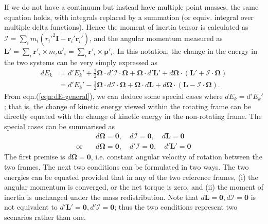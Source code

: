 If we do not have a continuum but instead have multiple point masses, the same equation holds, with integrals replaced by a summation (or equiv. integral over multiple delta functions). Hence the moment of inertia tensor is calculated as $\mathcal{I} = \sum_i m_i (r_i'^2 \mathbf{I} - \mathbf{r}_i'\mathbf{r}_i')$, and the angular momentum measured as $\mathbf{L}' = \sum_i \mathbf{r}'_i \times m_i \mathbf{u}'_i = \sum_i \mathbf{r}'_i \times \mathbf{p}'_i$.
In this notation, the change in the energy in the two systems can be very simply expressed as
%
\begin{equation}\label{eqn:dE-general}
\begin{aligned}
    dE_k &= d'E_k' + \frac{1}{2} \boldsymbol{\Omega} \cdot d' \mathcal{I} \cdot \boldsymbol{\Omega} + \boldsymbol{\Omega} \cdot d'\mathbf{L}' + d\boldsymbol{\Omega} \cdot (\mathbf{L}' + \mathcal{I}\cdot \boldsymbol{\Omega}) \\ 
    &= d'E_k' - \frac{1}{2} \boldsymbol{\Omega} \cdot d \mathcal{I} \cdot \boldsymbol{\Omega} + \boldsymbol{\Omega} \cdot d\mathbf{L} + d\boldsymbol{\Omega} \cdot (\mathbf{L} - \mathcal{I}\cdot \boldsymbol{\Omega}).
\end{aligned}
\end{equation}
%
From eqn.(\ref{eqn:dE-general}), we can deduce some special cases where $dE_k = d'E_k'$; that is, the change of kinetic energy viewed within the rotating frame can be directly equated with the change of kinetic energy in the non-rotating frame. The special cases can be summarised as 
%
\[
\begin{aligned}
    &d\boldsymbol{\Omega} = \mathbf{0},\quad d\mathcal{I} = \mathbf{0},\quad d\mathbf{L} = \mathbf{0} \\ 
    \text{or}\quad &d\boldsymbol{\Omega} = \mathbf{0},\quad d'\mathcal{I} = \mathbf{0},\quad d'\mathbf{L}' = \mathbf{0}
\end{aligned}
\]
%
The first premise is $d\boldsymbol{\Omega} = \mathbf{0}$, i.e. constant angular velocity of rotation between the two frames. The next two conditions can be formulated in two ways. The two energies can be equated provided that in any of the two reference frames, (i) the angular momentum is converged, or the net torque is zero, and (ii) the moment of inertia is unchanged under the mass redistribution. Note that $d\mathbf{L} = \mathbf{0}, d\mathcal{I} = \mathbf{0}$ is not equivalent to $d'\mathbf{L}' = \mathbf{0}, d'\mathcal{I} = \mathbf{0}$; thus the two conditions represent two scenarios rather than one.

